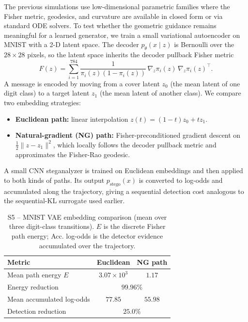 \documentclass[a4paper,fleqn]{cas-dc}
\begin{document}
The previous simulations use low-dimensional parametric families where the
Fisher metric, geodesics, and curvature are available in closed form or via
standard ODE solvers.  To test whether the geometric guidance remains
meaningful for a learned generator, we train a small variational autoencoder
\cite{kingma2014vae} on MNIST with a 2-D latent space.  The decoder
$p_{\theta}(x\mid z)$ is Bernoulli over the $28\times 28$ pixels, so the
latent space inherits the decoder pullback Fisher metric
\begin{equation}
  F(z)=\sum_{i=1}^{784}\frac{1}{\pi_i(z)(1-\pi_i(z))}
  \,\nabla_z\pi_i(z)\,\nabla_z\pi_i(z)^{\!\top}.
\end{equation}
A message is encoded by moving from a cover latent $z_0$ (the mean latent of
one digit class) to a target latent $z_1$ (the mean latent of another class).
We compare two embedding strategies:
\begin{itemize}
  \item \textbf{Euclidean path:} linear interpolation $z(t)=(1-t)z_0+tz_1$.
  \item \textbf{Natural-gradient (NG) path:} Fisher-preconditioned gradient
        descent on $\tfrac12\|z-z_1\|^2$, which locally follows the decoder
        pullback metric and approximates the Fisher-Rao geodesic.
\end{itemize}

A small CNN steganalyzer is trained on Euclidean embeddings and then applied
to both kinds of paths.  Its output $p_{\mathrm{stego}}(x)$ is converted to
log-odds and accumulated along the trajectory, giving a sequential detection
cost analogous to the sequential-KL surrogate used earlier.

\begin{table}[ht]
  \centering
  \caption{S5 -- MNIST VAE embedding comparison (mean over three digit-class
    transitions).  $E$ is the discrete Fisher path energy; Acc. log-odds is
    the detector evidence accumulated over the trajectory.}
  \label{tab:s5}
  \begin{tabular}{lcc}
    \toprule
    Metric & Euclidean & NG path \\
    \midrule
    Mean path energy $E$ & $3.07\times10^{3}$ & $1.17$ \\
    Energy reduction & \multicolumn{2}{c}{$99.96\%$} \\
    Mean accumulated log-odds & $77.85$ & $55.98$ \\
    Detection reduction & \multicolumn{2}{c}{$25.0\%$} \\
    \bottomrule
  \end{tabular}
\end{table}
\end{document}
